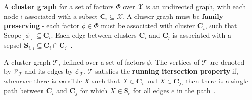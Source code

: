 \begin{definition}
A \textbf{cluster graph} for a set of factors $\Phi$ over $\mathcal{X}$ is an undirected graph, with each node $i$ associated  with a subset $\pmb{C}_{i} \subseteq \mathcal{X}$. A cluster graph must be \textbf{family preserving} - each factor $\phi \in \Phi$ must be associated with cluster $\pmb{C}_{i}$, such that $\mbox{Scope}[ \phi ] \subseteq \pmb{C}_{i} $. Each edge between clusters $\pmb{C}_{i}$ and $\pmb{C}_{j}$ is associated with a sepset $\pmb{S}_{i, j} \subseteq \pmb{C}_{i} \cap \pmb{C}_{j} $~\cite{Koller_clique_trees, Barber_junction_tree}.
\end{definition}

\begin{definition}
A cluster graph $\mathcal{T}$, defined over a set of factors $\phi$. The vertices of $\mathcal{T}$ are denoted by $\mathcal{V}_{\mathcal{T}}$ and its edges by $\mathcal{E}_{\mathcal{T}}$. $\mathcal{T}$ satisfies the \textbf{running itersection property} if, whenever there is varaible $X$ such that $X \in \pmb{C}_{i}$ and $X \in \pmb{C}_{j}$, then there is a single path between $\pmb{C}_{i}$ and $\pmb{C}_{j}$ for which $X \in \pmb{S}_{e}$ for all edges $e$ in the path~\cite{Koller_clique_trees, Barber_junction_tree}.
\end{definition}